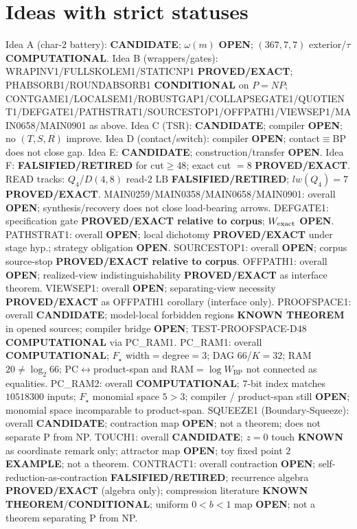 \documentclass[11pt]{article}
\begin{document}
\section*{Ideas with strict statuses}
Idea A (char-2 battery): \textbf{CANDIDATE}; $\omega(m)$ \textbf{OPEN}; $(367,7,7)$ exterior/$\tau$ \textbf{COMPUTATIONAL}.
Idea B (wrappers/gates): WRAPINV1/FULLSKOLEM1/STATICNP1 \textbf{PROVED/EXACT};
PHABSORB1/ROUNDABSORB1 \textbf{CONDITIONAL} on $P=NP$;
CONTGAME1/LOCALSEM1/ROBUSTGAP1/COLLAPSEGATE1/QUOTIENT1/DEFGATE1/PATHSTRAT1/SOURCESTOP1/OFFPATH1/VIEWSEP1/MAIN0658/MAIN0901 as above.
Idea C (TSR): \textbf{CANDIDATE}; compiler \textbf{OPEN}; no $(T,S,R)$ improve.
Idea D (contact/switch): compiler \textbf{OPEN}; contact$\equiv$BP does not close gap.
Idea E: \textbf{CANDIDATE}; construction/transfer \textbf{OPEN}.
Idea F: \textbf{FALSIFIED/RETIRED} for cut$\ge48$; exact cut $=8$ \textbf{PROVED/EXACT}.
READ tracks: $Q_4$/$D(4,8)$ read-$2$ LB \textbf{FALSIFIED/RETIRED}; $lw(Q_4)=7$ \textbf{PROVED/EXACT}.
MAIN0259/MAIN0358/MAIN0658/MAIN0901: overall \textbf{OPEN}; synthesis/recovery does not close load-bearing arrows.
DEFGATE1: specification gate \textbf{PROVED/EXACT relative to corpus}; $W_{\rm exact}$ \textbf{OPEN}.
PATHSTRAT1: overall \textbf{OPEN}; local dichotomy \textbf{PROVED/EXACT} under stage hyp.; strategy obligation \textbf{OPEN}.
SOURCESTOP1: overall \textbf{OPEN}; corpus source-stop \textbf{PROVED/EXACT relative to corpus}.
OFFPATH1: overall \textbf{OPEN}; realized-view indistinguishability \textbf{PROVED/EXACT} as interface theorem.
VIEWSEP1: overall \textbf{OPEN}; separating-view necessity \textbf{PROVED/EXACT} as OFFPATH1 corollary (interface only).
PROOFSPACE1: overall \textbf{CANDIDATE}; model-local forbidden regions \textbf{KNOWN THEOREM} in opened sources;
compiler bridge \textbf{OPEN}; TEST-PROOFSPACE-D48 \textbf{COMPUTATIONAL} via PC\_RAM1.
PC\_RAM1: overall \textbf{COMPUTATIONAL}; $F_\star$ width$=$degree$=3$; DAG $66$/$K{=}32$; RAM $20\neq\log_2 66$;
PC$\leftrightarrow$product-span and RAM$=\log W_{\mathrm{BP}}$ not connected as equalities.
PC\_RAM2: overall \textbf{COMPUTATIONAL}; $7$-bit index matches $10518300$ inputs; $F_\star$ monomial space $5{>}3$;
compiler / product-span still \textbf{OPEN}; monomial space incomparable to product-span.
SQUEEZE1 (Boundary-Squeeze): overall \textbf{CANDIDATE}; contraction map \textbf{OPEN}; not a theorem;
does not separate P from NP.
TOUCH1: overall \textbf{CANDIDATE}; $z{=}0$ touch \textbf{KNOWN} as coordinate remark only; attractor map \textbf{OPEN}; toy fixed point $2$ \textbf{EXAMPLE}; not a theorem.
CONTRACT1: overall contraction \textbf{OPEN}; self-reduction-as-contraction \textbf{FALSIFIED/RETIRED};
recurrence algebra \textbf{PROVED/EXACT} (algebra only); compression literature \textbf{KNOWN THEOREM}/\textbf{CONDITIONAL};
uniform $0{<}b{<}1$ map \textbf{OPEN}; not a theorem separating P from NP.
\end{document}
